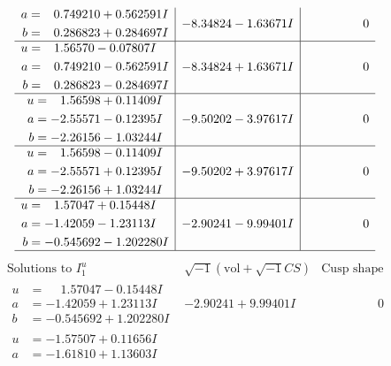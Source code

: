 \documentclass[1p]{elsarticle_modified}
\theoremstyle{definition}
\newcommand{\I}{\sqrt{-1}}
\begin{document}
$$\begin{array}{c|c|c}
\begin{aligned}
a &= \phantom{-}0.749210 + 0.562591 I \\
b &= \phantom{-}0.286823 + 0.284697 I\end{aligned}
 & -8.34824 - 1.63671 I & \phantom{-0.000000 } 0 \\ \hline\begin{aligned}
u &= \phantom{-}1.56570 - 0.07807 I \\
a &= \phantom{-}0.749210 - 0.562591 I \\
b &= \phantom{-}0.286823 - 0.284697 I\end{aligned}
 & -8.34824 + 1.63671 I & \phantom{-0.000000 } 0 \\ \hline\begin{aligned}
u &= \phantom{-}1.56598 + 0.11409 I \\
a &= -2.55571 - 0.12395 I \\
b &= -2.26156 - 1.03244 I\end{aligned}
 & -9.50202 - 3.97617 I & \phantom{-0.000000 } 0 \\ \hline\begin{aligned}
u &= \phantom{-}1.56598 - 0.11409 I \\
a &= -2.55571 + 0.12395 I \\
b &= -2.26156 + 1.03244 I\end{aligned}
 & -9.50202 + 3.97617 I & \phantom{-0.000000 } 0 \\ \hline\begin{aligned}
u &= \phantom{-}1.57047 + 0.15448 I \\
a &= -1.42059 - 1.23113 I \\
b &= -0.545692 - 1.202280 I\end{aligned}
 & -2.90241 - 9.99401 I & \phantom{-0.000000 } 0\\
 \hline 
 \end{array}$$\newpage$$\begin{array}{c|c|c}  
\text{Solutions to }I^u_{1}& \I (\text{vol} + \sqrt{-1}CS) & \text{Cusp shape}\\
 \hline 
\begin{aligned}
u &= \phantom{-}1.57047 - 0.15448 I \\
a &= -1.42059 + 1.23113 I \\
b &= -0.545692 + 1.202280 I\end{aligned}
 & -2.90241 + 9.99401 I & \phantom{-0.000000 } 0 \\ \hline\begin{aligned}
u &= -1.57507 + 0.11656 I \\
a &= -1.61810 + 1.13603 I \\

\end{aligned}
\end{array}$$
\end{document}
